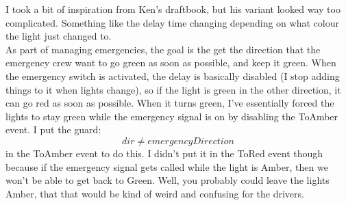 \documentclass[a4paper]{article}
\begin{document}
I took a bit of inspiration from Ken's draftbook, but his variant looked way too complicated. Something like the delay time changing depending on what colour the light just changed to.\\
As part of managing emergencies, the goal is the get the direction that the emergency crew want to go green as soon as possible, and keep it green. When the emergency switch is activated, the delay is basically disabled (I stop adding things to it when lights change), so if the light is green in the other direction, it can go red as soon as possible. When it turns green, I've essentially forced the lights to stay green while the emergency signal is on by disabling the ToAmber event. I put the guard:
\begin{equation}
dir \not= emergencyDirection
\end{equation}
in the ToAmber event to do this. I didn't put it in the ToRed event though because if the emergency signal gets called while the light is Amber, then we won't be able to get back to Green. Well, you probably could leave the lights Amber, that that would be kind of weird and confusing for the drivers.
\end{document}
